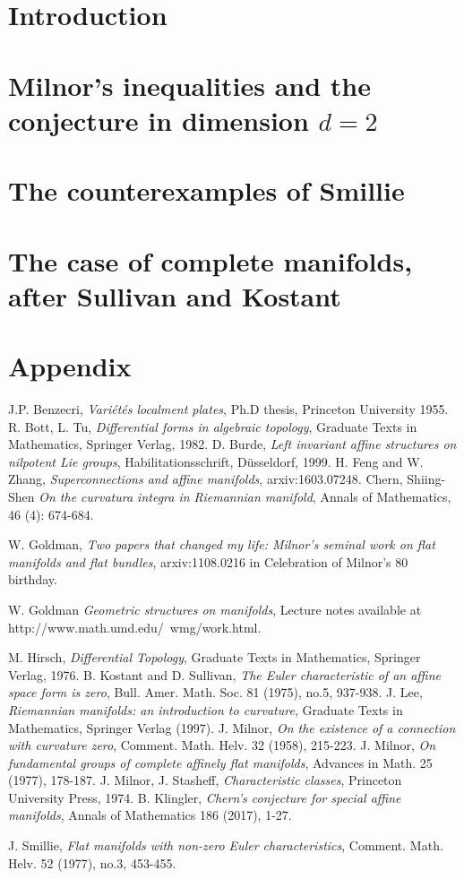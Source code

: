 \documentclass[12pt,letterpaper]{book}
\theoremstyle{definition}
\begin{document}
%
\tableofcontents
\chapter{Introduction}
%
\chapter{Milnor's inequalities and the conjecture in dimension $d=2$}
%
\chapter{The counterexamples of Smillie}
%
\chapter{The case of complete manifolds, after Sullivan and Kostant}
%
\chapter{Appendix}
%


J.P. Benzecri, {\em Vari\'et\'es localment plates}, Ph.D thesis, Princeton University 1955.
R. Bott, L. Tu, {\em Differential forms in algebraic topology}, Graduate Texts in Mathematics, Springer Verlag, 1982.
D. Burde, {\em Left invariant affine structures on nilpotent Lie groups}, Habilitationsschrift, D\"usseldorf, 1999.
H. Feng and W. Zhang,
{\em Superconnections and affine manifolds},  arxiv:1603.07248.
Chern, Shiing-Shen  { \em On the curvatura integra in Riemannian manifold}, Annals of Mathematics, 46 (4): 674-684.

W. Goldman,
{\em Two papers that changed my life: Milnor's seminal work on flat manifolds and flat bundles}, arxiv:1108.0216 in Celebration of Milnor's 80 birthday.

W. Goldman
{\em Geometric structures on manifolds}, Lecture notes available at http://www.math.umd.edu/~wmg/work.html.

M. Hirsch, {\em Differential Topology}, Graduate Texts in Mathematics, Springer Verlag, 1976.
B. Kostant and D. Sullivan,
{\em The Euler characteristic of an affine space form is zero},
Bull. Amer. Math. Soc. 81 (1975), no.5, 937-938.
J. Lee, {\em Riemannian manifolds: an introduction to curvature}, Graduate Texts in Mathematics, Springer Verlag (1997).
J. Milnor,
{\em On the existence of a connection with curvature zero}, Comment. Math. Helv. 32 (1958),
215-223.
J. Milnor, {\em On fundamental groups of complete affinely flat manifolds}, Advances in Math. 25
(1977), 178-187.
J. Milnor, J. Stasheff, {\em Characteristic classes}, Princeton University Press, 1974.
B. Klingler,
{\em Chern's conjecture for special affine manifolds}, Annals of Mathematics 186 (2017), 1-27.

J. Smillie,
{\em Flat manifolds with non-zero Euler characteristics}, Comment. Math. Helv. 52 (1977),
no.3, 453-455.


\printindex 
\end{document}
